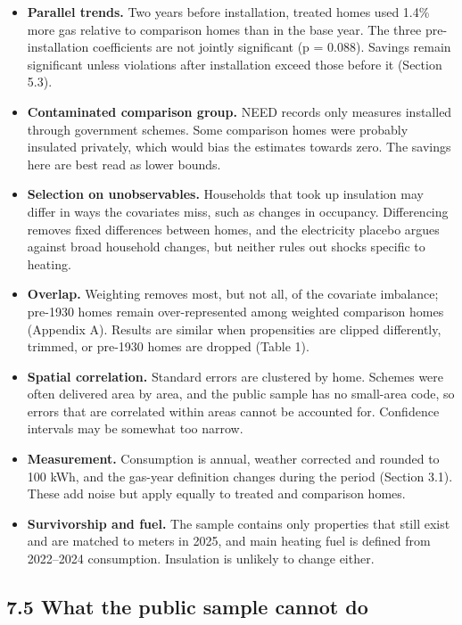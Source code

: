 \documentclass[11pt,a4paper]{article}
\providecommand{\tightlist}{\setlength{\itemsep}{0pt}\setlength{\parskip}{0pt}}
\begin{document}
\begin{itemize}
\tightlist
\item
  \textbf{Parallel trends.} Two years before installation, treated homes used 1.4\% more gas relative to comparison homes than in the base year. The three pre-installation coefficients are not jointly significant (p = 0.088). Savings remain significant unless violations after installation exceed those before it (Section 5.3).
\item
  \textbf{Contaminated comparison group.} NEED records only measures installed through government schemes. Some comparison homes were probably insulated privately, which would bias the estimates towards zero. The savings here are best read as lower bounds.
\item
  \textbf{Selection on unobservables.} Households that took up insulation may differ in ways the covariates miss, such as changes in occupancy. Differencing removes fixed differences between homes, and the electricity placebo argues against broad household changes, but neither rules out shocks specific to heating.
\item
  \textbf{Overlap.} Weighting removes most, but not all, of the covariate imbalance; pre-1930 homes remain over-represented among weighted comparison homes (Appendix A). Results are similar when propensities are clipped differently, trimmed, or pre-1930 homes are dropped (Table 1).
\item
  \textbf{Spatial correlation.} Standard errors are clustered by home. Schemes were often delivered area by area, and the public sample has no small-area code, so errors that are correlated within areas cannot be accounted for. Confidence intervals may be somewhat too narrow.
\item
  \textbf{Measurement.} Consumption is annual, weather corrected and rounded to 100 kWh, and the gas-year definition changes during the period (Section 3.1). These add noise but apply equally to treated and comparison homes.
\item
  \textbf{Survivorship and fuel.} The sample contains only properties that still exist and are matched to meters in 2025, and main heating fuel is defined from 2022--2024 consumption. Insulation is unlikely to change either.
\end{itemize}

\subsection*{7.5 What the public sample cannot do}
\end{document}
